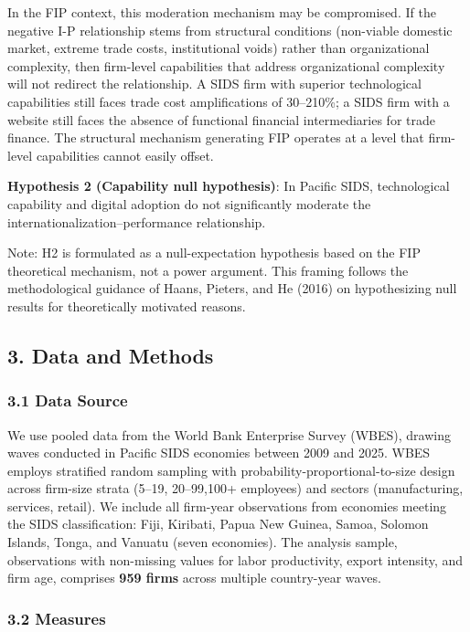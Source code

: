 \documentclass[
  12pt,a4paper]{article}
\begin{document}
In the FIP context, this moderation mechanism may be compromised. If the
negative I-P relationship stems from structural conditions (non-viable
domestic market, extreme trade costs, institutional voids) rather than
organizational complexity, then firm-level capabilities that address
organizational complexity will not redirect the relationship. A SIDS
firm with superior technological capabilities still faces trade cost
amplifications of 30--210\%; a SIDS firm with a website still faces the
absence of functional financial intermediaries for trade finance. The
structural mechanism generating FIP operates at a level that firm-level
capabilities cannot easily offset.

\textbf{Hypothesis 2 (Capability null hypothesis)}: In Pacific SIDS,
technological capability and digital adoption do not significantly
moderate the internationalization--performance relationship.

Note: H2 is formulated as a null-expectation hypothesis based on the FIP
theoretical mechanism, not a power argument. This framing follows the
methodological guidance of Haans, Pieters, and He (2016) on
hypothesizing null results for theoretically motivated reasons.

\hypertarget{data-and-methods}{%
\subsection{3. Data and Methods}\label{data-and-methods}}

\hypertarget{data-source}{%
\subsubsection{3.1 Data Source}\label{data-source}}

We use pooled data from the World Bank Enterprise Survey (WBES), drawing
waves conducted in Pacific SIDS economies between 2009 and 2025. WBES
employs stratified random sampling with probability-proportional-to-size
design across firm-size strata (5--19, 20--99,100+ employees) and
sectors (manufacturing, services, retail). We include all firm-year
observations from economies meeting the SIDS classification: Fiji,
Kiribati, Papua New Guinea, Samoa, Solomon Islands, Tonga, and Vanuatu
(seven economies). The analysis sample, observations with non-missing
values for labor productivity, export intensity, and firm age, comprises
\textbf{959 firms} across multiple country-year waves.

\hypertarget{measures}{%
\subsubsection{3.2 Measures}\label{measures}}
\end{document}
